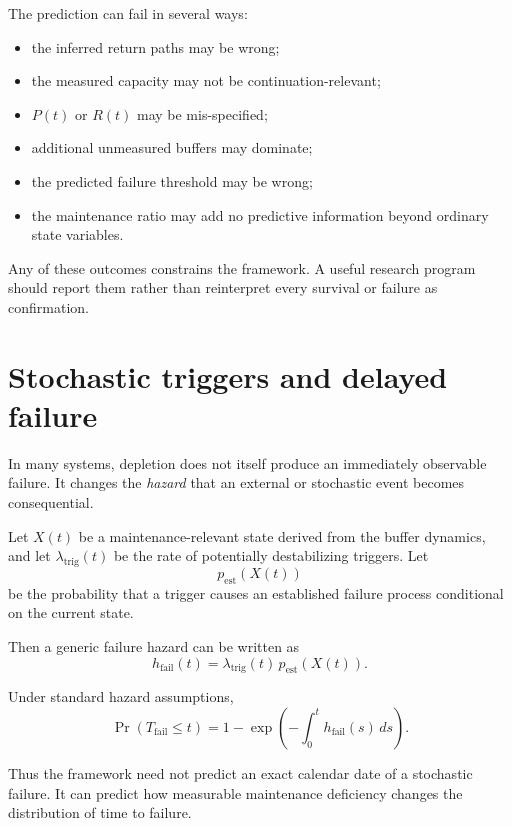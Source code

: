 \documentclass[11pt,a4paper]{article}
\begin{document}
The prediction can fail in several ways:
\begin{itemize}[nosep]
    \item the inferred return paths may be wrong;
    \item the measured capacity may not be continuation-relevant;
    \item $P(t)$ or $R(t)$ may be mis-specified;
    \item additional unmeasured buffers may dominate;
    \item the predicted failure threshold may be wrong;
    \item the maintenance ratio may add no predictive information beyond ordinary state variables.
\end{itemize}

Any of these outcomes constrains the framework. A useful research program should report them rather than reinterpret every survival or failure as confirmation.

\section{Stochastic triggers and delayed failure}

In many systems, depletion does not itself produce an immediately observable failure. It changes the \emph{hazard} that an external or stochastic event becomes consequential.

Let $X(t)$ be a maintenance-relevant state derived from the buffer dynamics, and let $\lambda_{\mathrm{trig}}(t)$ be the rate of potentially destabilizing triggers. Let
\[
p_{\mathrm{est}}\!\left(X(t)\right)
\]
be the probability that a trigger causes an established failure process conditional on the current state.

Then a generic failure hazard can be written as
\begin{equation}
h_{\mathrm{fail}}(t)
=
\lambda_{\mathrm{trig}}(t)\,
p_{\mathrm{est}}\!\left(X(t)\right).
\label{eq:hazard}
\end{equation}

Under standard hazard assumptions,
\begin{equation}
\Pr(T_{\mathrm{fail}}\le t)
=
1-
\exp\left(
-\int_0^t h_{\mathrm{fail}}(s)\,ds
\right).
\label{eq:failure-cdf}
\end{equation}

Thus the framework need not predict an exact calendar date of a stochastic failure. It can predict how measurable maintenance deficiency changes the distribution of time to failure.
\end{document}
